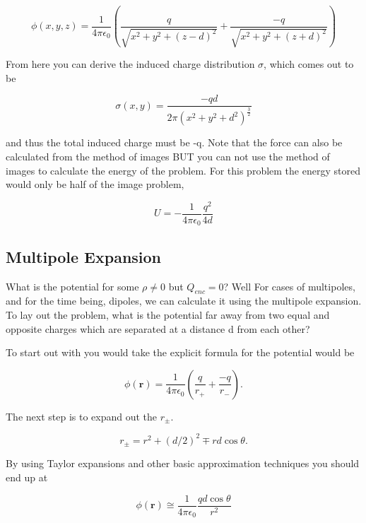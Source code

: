 \documentclass[preprint, review,12pt]{elsarticle}
\def\k{\frac{1}{4 \pi \epsilon_0}}
\def\b{\textbf}
\begin{document}
\begin{equation}
    \phi(x,y,z) = \frac{1}{4 \pi \epsilon_0}(\frac{q}{\sqrt{x^2+y^2+(z-d)^2}} + \frac{-q}{\sqrt{x^2+y^2+(z+d)^2}})
\end{equation}

From here you can derive the induced charge distribution $\sigma$, which comes out to be

\begin{equation}
    \sigma(x,y) = \frac{-qd}{2\pi (x^2+y^2+d^2)^{\frac{3}{2}}}
\end{equation}

and thus the total induced charge must be -q. Note that the force can also be calculated from the method of images BUT you can not use the method of images to calculate the energy of the problem. For this problem the energy stored would only be half of the image problem,

\begin{equation}
    U = -\k\frac{q^2}{4d}
\end{equation}

\subsection{Multipole Expansion}

What is the potential for some $\rho \neq 0$ but $Q_{enc} = 0$? Well For cases of multipoles, and for the time being, dipoles, we can calculate it using the multipole expansion. To lay out the problem, what is the potential far away from two equal and opposite charges which are separated at a distance d from each other?

To start out with you would take the explicit formula for the potential would be 

\begin{equation}
    \phi(\b{r}) = \frac{1}{4\pi \epsilon_0}(\frac{q}{r_+}+\frac{-q}{r_-}).
\end{equation}

The next step is to expand out the $r_\pm$.

\begin{equation}
    r_\pm = r^2 + (d/2)^2 \mp rd\cos\theta.
\end{equation}

By using Taylor expansions and other basic approximation techniques you should end up at

\begin{equation}
    \phi(\b{r}) \cong \k \frac{qd\cos\theta}{r^2}
\end{equation}
\end{document}
